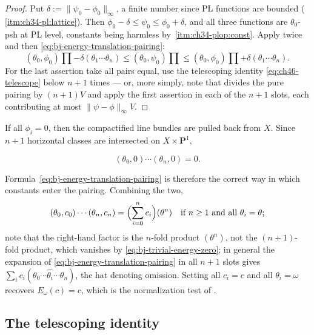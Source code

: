 \begin{proof}
Put $\delta:=\lVert\psi_0-\phi_0\rVert_\infty$, a finite number since PL
functions are bounded (\,\cref{itm:ch34-pl:lattice}).
Then $\phi_0-\delta\le\psi_0\le\phi_0+\delta$, and all three functions
are $\theta_0$-psh at PL level, constants being harmless by
\,\cref{itm:ch34-plop:const}.  Apply
 twice and then
\eqref{eq:bj-energy-translation-pairing}:
\[
 (\theta_0,\phi_0)\prod-\delta(\theta_1\cdots\theta_n)
 \le(\theta_0,\psi_0)\prod
 \le(\theta_0,\phi_0)\prod+\delta(\theta_1\cdots\theta_n).
\]
For the last assertion take all pairs equal, use the telescoping identity
\eqref{eq:ch46-telescope} below $n+1$ times --- or, more simply, note
that  divides the pure pairing by $(n+1)V$ and
apply the first assertion in each of the $n+1$ slots, each contributing
at most $\lVert\psi-\phi\rVert_\infty V$.
\end{proof}

\begin{example}
\label{ex:ch46-trivial-metric}
If all $\phi_i=0$, then the compactified line bundles are pulled back
from $X$.  Since $n+1$ horizontal classes are intersected on
$X\times\mathbf P^1$,

\[
                    (\theta_0,0)\cdots(\theta_n,0)=0.
\tag{46.8}\label{eq:bj-trivial-energy-zero}
\]

Formula~\eqref{eq:bj-energy-translation-pairing} is therefore the correct
way in which constants enter the pairing.  Combining the two,
\[
 (\theta_0,c_0)\cdots(\theta_n,c_n)
 =\Bigl(\sum_{i=0}^nc_i\Bigr)(\theta^n)
 \quad\text{if }n\ge1\text{ and all }\theta_i=\theta;
\]
note that the right-hand factor is the $n$-fold product $(\theta^n)$,
not the $(n+1)$-fold product, which vanishes by
\eqref{eq:bj-trivial-energy-zero};
in general the expansion of \eqref{eq:bj-energy-translation-pairing} in all
$n+1$ slots gives
$\sum_{i}c_i(\theta_0\cdots\widehat{\theta_i}\cdots\theta_n)$, the hat
denoting omission.  Setting all $c_i=c$ and all $\theta_i=\omega$
recovers $E_\omega(c)=c$, which is the normalization test of
.
\end{example}

\subsection{The telescoping identity}
\label{sec:ch46-telescope}

